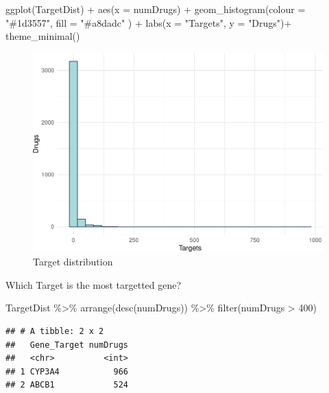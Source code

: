 \documentclass[
]{book}
\newenvironment{Shaded}{\begin{snugshade}}{\end{snugshade}}
\newcommand{\AttributeTok}[1]{\textcolor[rgb]{0.77,0.63,0.00}{#1}}
\newcommand{\DecValTok}[1]{\textcolor[rgb]{0.00,0.00,0.81}{#1}}
\newcommand{\FunctionTok}[1]{\textcolor[rgb]{0.00,0.00,0.00}{#1}}
\newcommand{\NormalTok}[1]{#1}
\newcommand{\SpecialCharTok}[1]{\textcolor[rgb]{0.00,0.00,0.00}{#1}}
\newcommand{\StringTok}[1]{\textcolor[rgb]{0.31,0.60,0.02}{#1}}
\begin{document}
\begin{Shaded}
\begin{Highlighting}[]
\FunctionTok{ggplot}\NormalTok{(TargetDist) }\SpecialCharTok{+}
  \FunctionTok{aes}\NormalTok{(}\AttributeTok{x =}\NormalTok{ numDrugs) }\SpecialCharTok{+}
  \FunctionTok{geom\_histogram}\NormalTok{(}\AttributeTok{colour =} \StringTok{"\#1d3557"}\NormalTok{, }\AttributeTok{fill =} \StringTok{"\#a8dadc"}\NormalTok{ ) }\SpecialCharTok{+}
  \FunctionTok{labs}\NormalTok{(}\AttributeTok{x =} \StringTok{"Targets"}\NormalTok{, }\AttributeTok{y =} \StringTok{"Drugs"}\NormalTok{)}\SpecialCharTok{+}
  \FunctionTok{theme\_minimal}\NormalTok{()}
\end{Highlighting}
\end{Shaded}

\begin{figure}
\centering
\includegraphics{NetMed_files/figure-latex/unnamed-chunk-17-1.pdf}
\caption{\label{fig:unnamed-chunk-17}Target distribution}
\end{figure}

Which Target is the most targetted gene?

\begin{Shaded}
\begin{Highlighting}[]
\NormalTok{TargetDist }\SpecialCharTok{\%\textgreater{}\%}
  \FunctionTok{arrange}\NormalTok{(}\FunctionTok{desc}\NormalTok{(numDrugs)) }\SpecialCharTok{\%\textgreater{}\%}
  \FunctionTok{filter}\NormalTok{(numDrugs }\SpecialCharTok{\textgreater{}} \DecValTok{400}\NormalTok{)}
\end{Highlighting}
\end{Shaded}

\begin{verbatim}
## # A tibble: 2 x 2
##   Gene_Target numDrugs
##   <chr>          <int>
## 1 CYP3A4           966
## 2 ABCB1            524
\end{verbatim}
\end{document}
